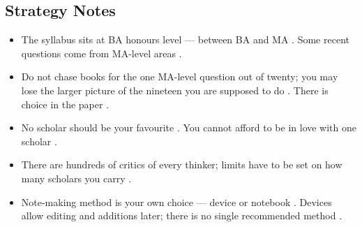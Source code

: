 \subsection{Strategy Notes}
\begin{itemize}
    \item The syllabus sits at BA honours level --- between BA and MA . Some recent questions come from MA-level areas .
    \item Do not chase books for the one MA-level question out of twenty; you may lose the larger picture of the nineteen you are supposed to do . There is choice in the paper .
    \item No scholar should be your favourite . You cannot afford to be in love with one scholar .
    \item There are hundreds of critics of every thinker; limits have to be set on how many scholars you carry .
    \item Note-making method is your own choice --- device or notebook . Devices allow editing and additions later; there is no single recommended method .
\end{itemize}

